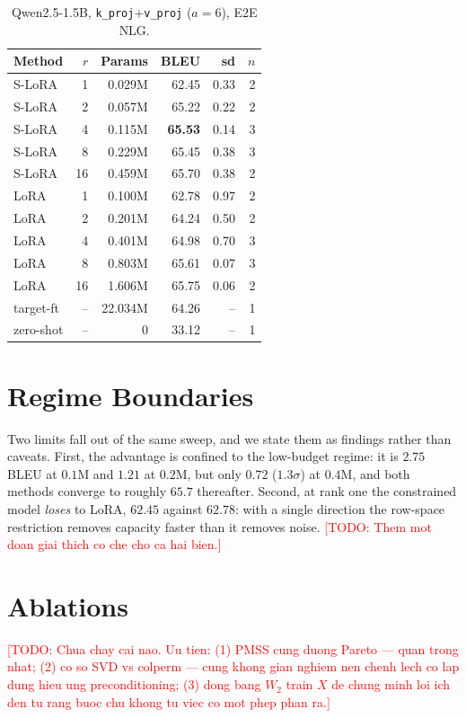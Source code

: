 \documentclass{article}
\newcommand{\TODO}[1]{\textcolor{red}{[TODO: #1]}}
\begin{document}
\begin{table}[t]\centering
\caption{Qwen2.5-1.5B, \texttt{k\_proj}+\texttt{v\_proj} ($a{=}6$), E2E NLG.}
\begin{tabular}{lrrrrr}
\toprule
Method & $r$ & Params & BLEU & sd & $n$ \\
\midrule
S-LoRA    &1  & 0.029M & 62.45 & 0.33 & 2 \\
S-LoRA    &2  & 0.057M & 65.22 & 0.22 & 2 \\
S-LoRA    &4  & 0.115M & \textbf{65.53} & 0.14 & 3 \\
S-LoRA    &8  & 0.229M & 65.45 & 0.38 & 3 \\
S-LoRA    &16 & 0.459M & 65.70 & 0.38 & 2 \\
\midrule
LoRA      & 1  & 0.100M & 62.78 & 0.97 & 2 \\
LoRA      & 2  & 0.201M & 64.24 & 0.50 & 2 \\
LoRA      & 4  & 0.401M & 64.98 & 0.70 & 3 \\
LoRA      & 8  & 0.803M & 65.61 & 0.07 & 3 \\
LoRA      & 16 & 1.606M & 65.75 & 0.06 & 2 \\
\midrule
target-ft & -- & 22.034M & 64.26 & -- & 1 \\
zero-shot & -- & 0 & 33.12 & -- & 1 \\
\bottomrule
\end{tabular}
\end{table}

\section{Regime Boundaries}
Two limits fall out of the same sweep, and we state them as findings rather
than caveats. First, the advantage is confined to the low-budget regime: it
is $2.75$ BLEU at $0.1$M and $1.21$ at $0.2$M, but only $0.72$ ($1.3\sigma$)
at $0.4$M, and both methods converge to roughly $65.7$ thereafter. Second,
at rank one the constrained model \emph{loses} to LoRA, $62.45$ against
$62.78$: with a single direction the row-space restriction removes capacity
faster than it removes noise.
\TODO{Them mot doan giai thich co che cho ca hai bien.}

\section{Ablations}
\TODO{Chua chay cai nao. Uu tien: (1) PMSS cung duong Pareto — quan trong
      nhat; (2) co so SVD vs colperm — cung khong gian nghiem nen chenh lech
      co lap dung hieu ung preconditioning; (3) dong bang $W_2$ train $X$ de
      chung minh loi ich den tu rang buoc chu khong tu viec co mot phep
      phan ra.}
\end{document}
